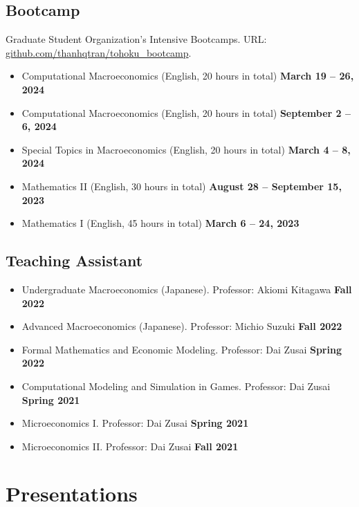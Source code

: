 \documentclass[12pt]{article}
\begin{document}
\subsection{Bootcamp}
Graduate Student Organization's Intensive Bootcamps. URL: \href{https://github.com/thanhqtran/tohoku_bootcamp}{github.com/thanhqtran/tohoku\_bootcamp}.
\begin{itemize}
	\item[ ] Computational Macroeconomics (English, 20 hours in total) \hfill {\bf March 19 -- 26, 2024}
	\item[ ] Computational Macroeconomics  (English, 20 hours in total) \hfill {\bf September 2 -- 6, 2024}
	\item[ ] Special Topics in Macroeconomics (English, 20 hours in total) \hfill {\bf March 4 -- 8, 2024}
	\item[ ] Mathematics II (English, 30 hours in total)  \hfill {\bf August 28 -- September 15, 2023}
	\item[ ] Mathematics I  (English, 45 hours in total)  \hfill {\bf March 6 -- 24, 2023}
\end{itemize}

\subsection{Teaching Assistant}
\begin{itemize}
	\item[ ] Undergraduate Macroeconomics (Japanese). Professor: Akiomi Kitagawa \hfill {\bf Fall 2022}
 	\item[ ] Advanced Macroeconomics (Japanese). Professor: Michio Suzuki \hfill {\bf Fall 2022}
  	\item[ ] Formal Mathematics and Economic Modeling. Professor: Dai Zusai \hfill {\bf Spring 2022}
   	\item[ ] Computational Modeling and Simulation in Games. Professor: Dai Zusai \hfill {\bf Spring 2021}
    	\item[ ] Microeconomics I. Professor: Dai Zusai \hfill {\bf Spring 2021}
     	\item[ ] Microeconomics II. Professor: Dai Zusai \hfill {\bf Fall 2021}
\end{itemize}


\section{Presentations}
\end{document}
